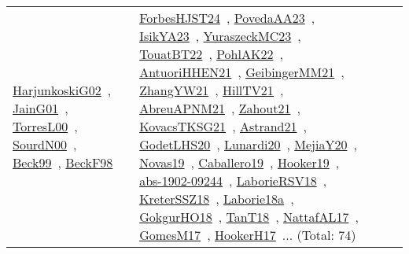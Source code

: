 {\begin{longtable}{lp{3cm}>{\raggedright\arraybackslash}p{6cm}>{\raggedright\arraybackslash}p{6cm}>{\raggedright\arraybackslash}p{8cm}}
\href{works/HarjunkoskiG02.pdf}{HarjunkoskiG02}~\cite{HarjunkoskiG02}, \href{works/JainG01.pdf}{JainG01}~\cite{JainG01}, \href{works/TorresL00.pdf}{TorresL00}~\cite{TorresL00}, \href{works/SourdN00.pdf}{SourdN00}~\cite{SourdN00}, \href{works/Beck99.pdf}{Beck99}~\cite{Beck99}, \href{works/BeckF98.pdf}{BeckF98}~\cite{BeckF98} & \href{works/ForbesHJST24.pdf}{ForbesHJST24}~\cite{ForbesHJST24}, \href{works/PovedaAA23.pdf}{PovedaAA23}~\cite{PovedaAA23}, \href{works/IsikYA23.pdf}{IsikYA23}~\cite{IsikYA23}, \href{works/YuraszeckMC23.pdf}{YuraszeckMC23}~\cite{YuraszeckMC23}, \href{works/TouatBT22.pdf}{TouatBT22}~\cite{TouatBT22}, \href{works/PohlAK22.pdf}{PohlAK22}~\cite{PohlAK22}, \href{works/AntuoriHHEN21.pdf}{AntuoriHHEN21}~\cite{AntuoriHHEN21}, \href{works/GeibingerMM21.pdf}{GeibingerMM21}~\cite{GeibingerMM21}, \href{works/ZhangYW21.pdf}{ZhangYW21}~\cite{ZhangYW21}, \href{works/HillTV21.pdf}{HillTV21}~\cite{HillTV21}, \href{works/AbreuAPNM21.pdf}{AbreuAPNM21}~\cite{AbreuAPNM21}, \href{works/Zahout21.pdf}{Zahout21}~\cite{Zahout21}, \href{works/KovacsTKSG21.pdf}{KovacsTKSG21}~\cite{KovacsTKSG21}, \href{works/Astrand21.pdf}{Astrand21}~\cite{Astrand21}, \href{works/GodetLHS20.pdf}{GodetLHS20}~\cite{GodetLHS20}, \href{works/Lunardi20.pdf}{Lunardi20}~\cite{Lunardi20}, \href{works/MejiaY20.pdf}{MejiaY20}~\cite{MejiaY20}, \href{works/Novas19.pdf}{Novas19}~\cite{Novas19}, \href{works/Caballero19.pdf}{Caballero19}~\cite{Caballero19}, \href{works/Hooker19.pdf}{Hooker19}~\cite{Hooker19}, \href{works/abs-1902-09244.pdf}{abs-1902-09244}~\cite{abs-1902-09244}, \href{works/LaborieRSV18.pdf}{LaborieRSV18}~\cite{LaborieRSV18}, \href{works/KreterSSZ18.pdf}{KreterSSZ18}~\cite{KreterSSZ18}, \href{works/Laborie18a.pdf}{Laborie18a}~\cite{Laborie18a}, \href{works/GokgurHO18.pdf}{GokgurHO18}~\cite{GokgurHO18}, \href{works/TanT18.pdf}{TanT18}~\cite{TanT18}, \href{works/NattafAL17.pdf}{NattafAL17}~\cite{NattafAL17}, \href{works/GomesM17.pdf}{GomesM17}~\cite{GomesM17}, \href{works/HookerH17.pdf}{HookerH17}~\cite{HookerH17}... (Total: 74)\\

\end{longtable}}
